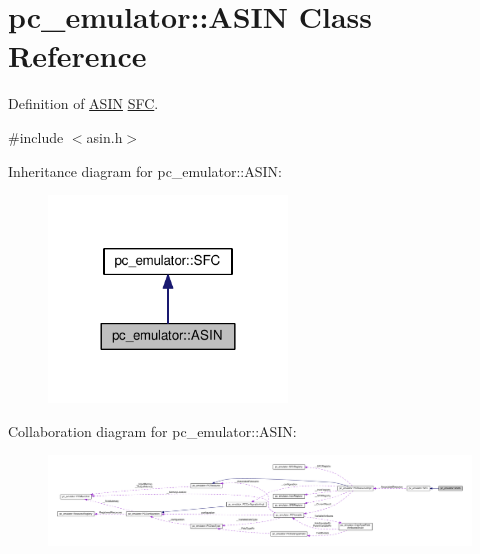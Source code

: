 \hypertarget{classpc__emulator_1_1ASIN}{}\section{pc\+\_\+emulator\+:\+:A\+S\+IN Class Reference}
\label{classpc__emulator_1_1ASIN}


Definition of \hyperlink{classpc__emulator_1_1ASIN}{A\+S\+IN} \hyperlink{classpc__emulator_1_1SFC}{S\+FC}.  




{\ttfamily \#include $<$asin.\+h$>$}



Inheritance diagram for pc\+\_\+emulator\+:\+:A\+S\+IN\+:
\nopagebreak
\begin{figure}[H]
\begin{center}
\leavevmode
\includegraphics[width=180pt]{classpc__emulator_1_1ASIN__inherit__graph}
\end{center}
\end{figure}


Collaboration diagram for pc\+\_\+emulator\+:\+:A\+S\+IN\+:
\nopagebreak
\begin{figure}[H]
\begin{center}
\leavevmode
\includegraphics[width=350pt]{classpc__emulator_1_1ASIN__coll__graph}
\end{center}
\end{figure}
